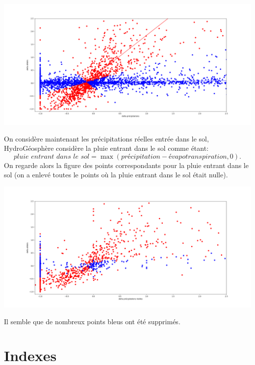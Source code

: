 \documentclass[a4paper,11pt]{article}
\begin{document}
\begin{center}
	\captionsetup{type=figure}
	\includegraphics[scale=0.33]{classification_deb_pr.png}
\end{center}

On considère maintenant les précipitations réelles entrée dans le sol, HydroGéosphère considère la pluie entrant dans le sol comme étant: 
\[\textit{pluie entrant dans le sol}=\max(\textit{précipitation}-\textit{évapotranspiration},0).\]
On regarde alors la figure des points correspondants pour la pluie entrant dans le sol (on a enlevé toutes le points où la pluie entrant dans le sol était nulle).

\begin{center}
	\captionsetup{type=figure}
	\includegraphics[scale=0.33]{classification_deb_prr.png}
\end{center}

Il semble que de nombreux points bleus ont été supprimés. 
\newpage

\section{Indexes}
\end{document}
